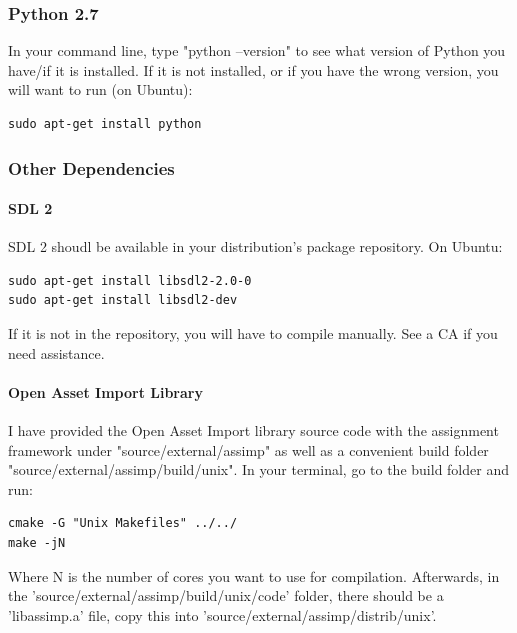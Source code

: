 \documentclass{article}
\begin{document}
\subsubsection*{Python 2.7}

In your command line, type "python --version" to see what version of Python you have/if it is installed. If it is not installed, or if you have the wrong version, you will want to run (on Ubuntu): 

\begin{lstlisting}
sudo apt-get install python
\end{lstlisting}

\subsubsection*{Other Dependencies}

\paragraph{\textbf{SDL 2}}

SDL 2 shoudl be available in your distribution's package repository. On Ubuntu:

\begin{lstlisting}
sudo apt-get install libsdl2-2.0-0
sudo apt-get install libsdl2-dev
\end{lstlisting}

If it is not in the repository, you will have to compile manually. See a CA if you need assistance.

\paragraph{\textbf{Open Asset Import Library}}

I have provided the Open Asset Import library source code with the assignment framework under "source/external/assimp" as well as a convenient build folder "source/external/assimp/build/unix". In your terminal, go to the build folder and run:

\begin{lstlisting}
cmake -G "Unix Makefiles" ../../
make -jN
\end{lstlisting}

Where N is the number of cores you want to use for compilation. Afterwards, in the 'source/external/assimp/build/unix/code' folder, there should be a 'libassimp.a' file, copy this into 'source/external/assimp/distrib/unix'.
\end{document}
